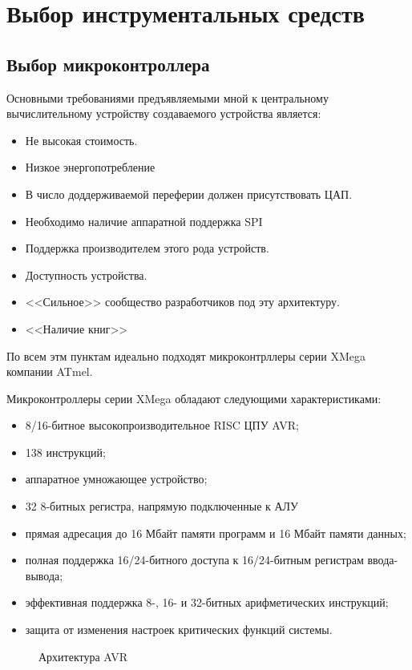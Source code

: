 \section{Выбор инструментальных средств}

\subsection{Выбор микроконтроллера}
Основными требованиями предъявляемыми мной к центральному вычислительному устройству создаваемого устройства является:
\begin{itemize}
	\item{} Не высокая стоимость.
	\item{} Низкое энергопотребление
	\item{} В число доддерживаемой переферии должен присутствовать ЦАП. 
	\item{} Необходимо наличие аппаратной поддержка SPI
	\item{} Поддержка производителем этого рода устройств.
	\item{} Доступность устройства.
	\item{} <<Сильное>> сообщество разработчиков под эту архитектуру.
	\item{} <<Наличие книг>>
\end{itemize}

По всем этм пунктам идеально подходят микроконтрллеры серии XMega компании ATmel.

Микроконтроллеры серии XMega обладают следующими характеристиками:
\begin{itemize}
	\item{} 8/16-битное высокопроизводительное RISC ЦПУ AVR;
	\item{} 138 инструкций;
	\item{} аппаратное умножающее устройство;
	\item{} 32 8-битных регистра, напрямую подключенные к АЛУ
	\item{} прямая адресация до 16 Мбайт памяти программ и 16 Мбайт памяти данных;
	\item{} полная поддержка 16/24-битного доступа к 16/24-битным регистрам ввода-вывода;
	\item{} эффективная поддержка 8-, 16- и 32-битных арифметических инструкций;
	\item{} защита от изменения настроек критических функций системы.
\end{itemize}

\begin{figure}[h]
	\caption{Архитектура AVR}
	\label{img:avr_arch}
\end{figure}

